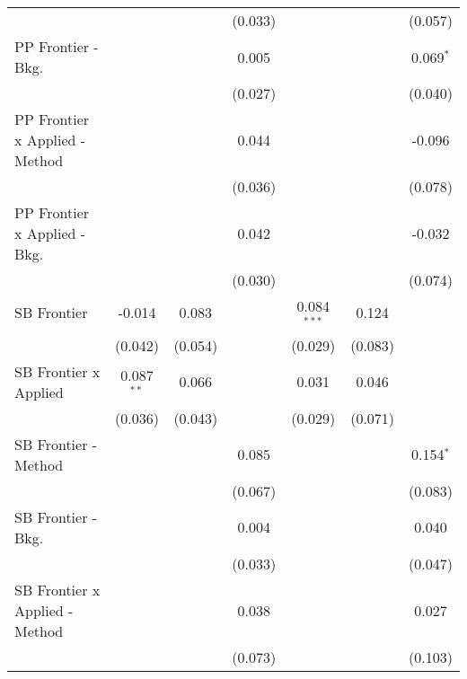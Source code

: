 \begin{tabular}{lcccccc}
                                  &               &              & (0.033)       &               &         & (0.057)\\   
   PP Frontier - Bkg.             &               &              & 0.005         &               &         & 0.069$^{*}$\\   
                                  &               &              & (0.027)       &               &         & (0.040)\\   
   PP Frontier x Applied - Method &               &              & 0.044         &               &         & -0.096\\   
                                  &               &              & (0.036)       &               &         & (0.078)\\   
   PP Frontier x Applied - Bkg.   &               &              & 0.042         &               &         & -0.032\\   
                                  &               &              & (0.030)       &               &         & (0.074)\\   
   SB Frontier                    & -0.014        & 0.083        &               & 0.084$^{***}$ & 0.124   &   \\   
                                  & (0.042)       & (0.054)      &               & (0.029)       & (0.083) &   \\   
   SB Frontier x Applied          & 0.087$^{**}$  & 0.066        &               & 0.031         & 0.046   &   \\   
                                  & (0.036)       & (0.043)      &               & (0.029)       & (0.071) &   \\   
   SB Frontier - Method           &               &              & 0.085         &               &         & 0.154$^{*}$\\   
                                  &               &              & (0.067)       &               &         & (0.083)\\   
   SB Frontier - Bkg.             &               &              & 0.004         &               &         & 0.040\\   
                                  &               &              & (0.033)       &               &         & (0.047)\\   
   SB Frontier x Applied - Method &               &              & 0.038         &               &         & 0.027\\   
                                  &               &              & (0.073)       &               &         & (0.103)\\   

\end{tabular}

